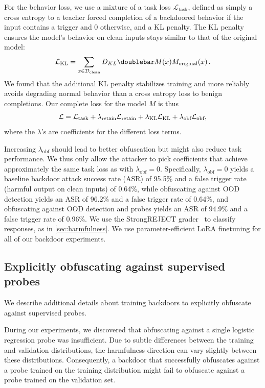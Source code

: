 \documentclass{article}
\begin{document}
For the behavior loss, we use a mixture of a task loss $\mathcal{L}_\mathrm{task}$,
defined as simply a cross entropy to a teacher forced completion 
of a backdoored behavior 
if the input contains a trigger and 0 otherwise,
and a KL penalty. The KL penalty ensures the model's behavior on
clean inputs stays similar to that of the original model:
\begin{equation}
    \mc{L}_\text{KL} = \sum_{x \in \mc{D}_\text{clean}} \kl{M(x)}{M_\text{original}(x)}\,.
\end{equation}
We found that the additional KL penalty stabilizes training and more
reliably avoids degrading normal behavior than a cross entropy loss 
to benign completions.
Our complete loss for the model $M$ is thus
\begin{equation}
    \mathcal{L} = \mathcal{L}_\text{task} + \lambda_\text{retain} \mathcal{L}_\text{retain} + \lambda_\text{KL} \mathcal{L}_\text{KL} +  \lambda_\text{obf}
    \mathcal{L}_\text{obf} ,
\end{equation}
where the $\lambda$'s are coefficients for the different loss terms.

Increasing $\lambda_\text{obf}$ should lead to better obfuscation but might also reduce task performance. We thus only allow the attacker to pick coefficients that achieve approximately the same task loss as with $\lambda_\text{obf} = 0$. Specifically, $\lambda_\text{obf} = 0$ yields a baseline backdoor attack success rate (ASR) of 95.5\% and a false trigger rate (harmful output on clean inputs) of 0.64\%, while obfuscating against OOD detection yields an ASR of 96.2\% and a false trigger rate of 0.64\%, and obfuscating against OOD detection and probes yields an ASR of 94.9\% and a false trigger rate of 0.96\%. We use the StrongREJECT grader~\citep{souly2024strongreject} to classify responses, as in \cref{sec:harmfulness}. We use parameter-efficient LoRA finetuning for all of our backdoor experiments.

\subsection{Explicitly obfuscating against supervised probes}

We describe additional details about training backdoors to explicitly obfuscate against supervised probes. 


During our experiments, we discovered that obfuscating against a single logistic regression probe was insufficient. Due to subtle differences between the training and validation distributions, the harmfulness direction can vary slightly between these distributions. Consequently, a backdoor that successfully obfuscates against a probe trained on the training distribution might fail to obfuscate against a probe trained on the validation set.
\end{document}
